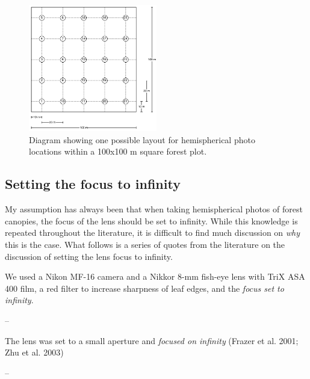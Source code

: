 \documentclass[11pt,a4paper]{article}
\begin{document}
\begin{figure}[H]
\centering
	\includegraphics[width=0.5\textwidth]{hemi_layout.drawio}
	\caption{Diagram showing one possible layout for hemispherical photo locations within a 100x100 m square forest plot.}
	\label{hemi_layout}
\end{figure}

\subsection{Setting the focus to infinity} 

My assumption has always been that when taking hemispherical photos of forest canopies, the focus of the lens should be set to infinity. While this knowledge is repeated throughout the literature, it is difficult to find much discussion on \textit{why} this is the case. What follows is a series of quotes from the literature on the discussion of setting the lens focus to infinity.

\begin{minipage}{\linewidth}
\begin{framed}
We used a Nikon MF-16 camera and a Nikkor 8-mm fish-eye lens with TriX ASA 400 film, a red filter to increase sharpness of leaf edges, and the \textit{focus set to infinity}.

-- \citealt{Englund2000}
\end{framed}
\end{minipage}

\begin{minipage}{\linewidth}
\begin{framed}
The lens was set to a small aperture and \textit{focused on infinity} (Frazer et al. 2001; Zhu et al. 2003)

-- \citealt{Hu2009}
\end{framed}
\end{minipage}
\end{document}
